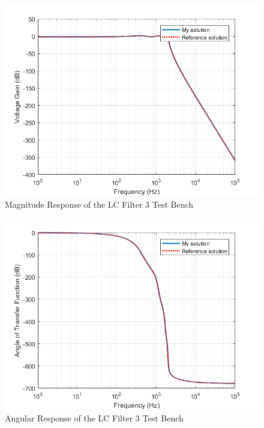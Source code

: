 \documentclass[a4paper,titlepage]{article}
\begin{document}
		\begin{figure}[H]
			\centering
			\includegraphics[width=0.7\linewidth]{../../src/a3/plots/LCFilter3_gain}
			\caption{Magnitude Response of the LC Filter 3 Test Bench}
			\label{lc3_mag}
		\end{figure}
		\begin{figure}[H]
			\centering
			\includegraphics[width=0.7\linewidth]{../../src/a3/plots/LCFilter3_angle}
			\caption{Angular Response of the LC Filter 3 Test Bench}
			\label{lc3_angle}
		\end{figure}
	
\end{document}
